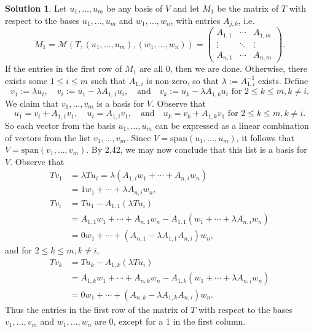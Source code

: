 \documentclass[12pt]{article}
\theoremstyle{definition}
\theoremstyle{exercise}
\theoremstyle{solution}
\newtheorem*{solution}{Solution}
\newcommand{\mat}{\mathcal{M}}
\newcommand{\Span}{\text{span}}
\newcommand{\quand}{\quad \text{and} \quad}
\begin{document}
\begin{solution}
    Let \( u_1, \ldots, u_m \) be any basis of \( V \) and let \( M_1 \) be the matrix of \( T \) with respect to the bases \( u_1, \ldots, u_m \) and \( w_1, \ldots, w_n \), with entries \( A_{j,k} \), i.e.\
    \[
        M_1 = \mat(T, (u_1, \ldots, u_m), (w_1, \ldots, w_n)) = \begin{pmatrix}
            A_{1,1} & \cdots & A_{1,m} \\
            \vdots & \ddots & \vdots \\
            A_{n,1} & \cdots & A_{n,m}
        \end{pmatrix}.
    \]
    If the entries in the first row of \( M_1 \) are all 0, then we are done. Otherwise, there exists some \( 1 \leq i \leq m \) such that \( A_{1,i} \) is non-zero, so that \( \lambda := A_{1,i}^{-1} \) exists. Define
    \[
        v_1 := \lambda u_i, \quad v_i := u_1 - \lambda A_{1,1} u_i, \quand v_k := u_k - \lambda A_{1,k} u_i \text{ for } 2 \leq k \leq m, k \neq i.
    \]
    We claim that \( v_1, \ldots, v_m \) is a basis for \( V \). Observe that
    \[
        u_1 = v_i + A_{1,1} v_1, \quad u_i = A_{1,i} v_1, \quand u_k = v_k + A_{1,k} v_1 \text{ for } 2 \leq k \leq m, k \neq i.
    \]
    So each vector from the basis \( u_1, \ldots, u_m \) can be expressed as a linear combination of vectors from the list \( v_1, \ldots, v_m \). Since \( V = \Span(u_1, \ldots, u_m) \), it follows that \( V = \Span(v_1, \ldots, v_m) \). By 2.42, we may now conclude that this list is a basis for \( V \). Observe that
    \begin{align*}
        Tv_1 &= \lambda Tu_i = \lambda(A_{1,i} w_1 + \cdots + A_{n,i} w_n) \\
        &= 1 w_1 + \cdots + \lambda A_{n,i} w_n, \\[2mm]
        Tv_i &= Tu_1 - A_{1,1} (\lambda Tu_i) \\
        &= A_{1,1} w_1 + \cdots + A_{n,1} w_n - A_{1,1}(w_1 + \cdots + \lambda A_{n,i} w_n) \\
        &= 0 w_1 + \cdots + (A_{n,1} - \lambda A_{1,1} A_{n,i}) w_n,
    \end{align*}
    and for \( 2 \leq k \leq m, k \neq i \),
    \begin{align*}
        Tv_k &= Tu_k - A_{1,k} (\lambda Tu_i) \\
        &= A_{1,k} w_1 + \cdots + A_{n,k} w_n - A_{1,k}(w_1 + \cdots + \lambda A_{n,i} w_n) \\
        &= 0 w_1 + \cdots + (A_{n,k} - \lambda A_{1,k} A_{n,i}) w_n.
    \end{align*}
    Thus the entries in the first row of the matrix of \( T \) with respect to the bases \( v_1, \ldots, v_m \) and \( w_1, \ldots, w_n \) are 0, except for a 1 in the first column.
\end{solution}
\end{document}
